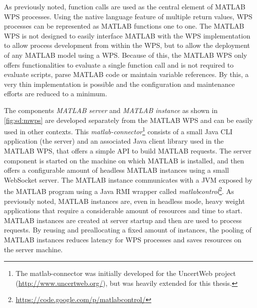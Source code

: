   As previously noted, function calls are used as the central element of MATLAB WPS processes. Using the native language feature of multiple return values, WPS processes can be represented as MATLAB functions one to one. The MATLAB WPS is not designed to easily interface MATLAB with the WPS implementation to allow process development from within the WPS, but to allow the deployment of any MATLAB model using a WPS. Because of this, the MATLAB WPS only offers functionalities to evaluate a single function call and is not required to evaluate scripts, parse MATLAB code or maintain variable references. By this, a very thin implementation is possible and the configuration and maintenance efforts are reduced to a minimum.

  The components \emph{MATLAB server} and \emph{MATLAB instance} as shown in \cref{fig:sd:mwps} are developed separately from the MATLAB WPS and can be easily used in other contexts. This \emph{matlab-connector}\footnote{The matlab-connector was initially developed for the UncertWeb project (\url{http://www.uncertweb.org/}), but was heavily extended for this thesis.} consists of a small Java CLI application (the server) and an associated Java client library used in the MATLAB WPS, that offers a simple \ac{API} to build MATLAB requests. The server component is started on the machine on which MATLAB is installed, and then offers a configurable amount of headless MATLAB instances using a small WebSocket server. The MATLAB instance communicates with a \ac{JVM} exposed by the MATLAB program using a Java \ac{RMI} wrapper called \emph{matlabcontrol}\footnote{\url{https://code.google.com/p/matlabcontrol/}}. As previously noted, MATLAB instances are, even in headless mode, heavy weight applications that require a considerable amount of resources and time to start. MATLAB instances are created at server startup and then are used to process requests. By reusing and preallocating a fixed amount of instances, the pooling of MATLAB instances reduces latency for WPS processes and saves resources on the server machine.

